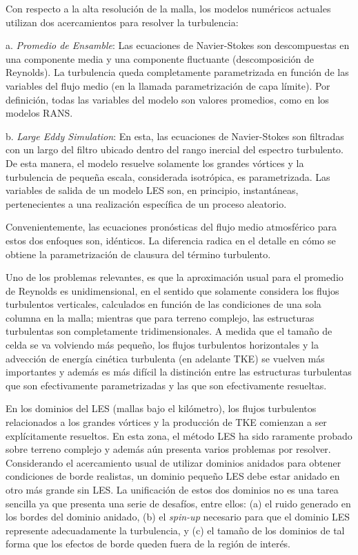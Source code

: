 Con respecto a la alta resolución de la malla, los modelos numéricos actuales utilizan dos acercamientos para resolver la turbulencia:
\begin{enumerate*}
	\item[a.] \emph{Promedio de Ensamble}: Las ecuaciones de Navier-Stokes son descompuestas en una componente media y una componente fluctuante (descomposición de Reynolds). La turbulencia queda completamente parametrizada en función de las variables del flujo medio (en la llamada parametrización de capa límite). Por definición, todas las variables del modelo son valores promedios, como en los modelos RANS.
	\item[b.] \emph{Large Eddy Simulation}: En esta, las ecuaciones de Navier-Stokes son filtradas con un largo del filtro ubicado dentro del rango inercial del espectro turbulento. De esta manera, el modelo resuelve solamente los grandes vórtices y la turbulencia de pequeña escala, considerada isotrópica, es parametrizada. Las variables de salida de un modelo LES son, en principio, instantáneas, pertenecientes a una realización específica de un proceso aleatorio.
\end{enumerate*} 

Convenientemente, las ecuaciones pronósticas del flujo medio atmosférico para estos dos enfoques son, idénticos. La diferencia radica en el detalle en cómo se obtiene la parametrización de clausura del término turbulento.

Uno de los problemas relevantes, es que la aproximación usual para el promedio de Reynolds es unidimensional, en el sentido que solamente considera los flujos turbulentos verticales, calculados en función de las condiciones de una sola columna en la malla; mientras que para terreno complejo, las estructuras turbulentas son completamente tridimensionales. A medida que el tamaño de celda se va volviendo más pequeño, los flujos turbulentos horizontales y la advección de energía cinética turbulenta (en adelante TKE) se vuelven más importantes y además es más difícil la distinción entre las estructuras turbulentas que son efectivamente parametrizadas y las que son efectivamente resueltas. 

En los dominios del LES (mallas bajo el kilómetro), los flujos turbulentos relacionados a los grandes vórtices y la producción de TKE comienzan a ser explícitamente resueltos. En esta zona, el método LES ha sido raramente probado sobre terreno complejo y además aún presenta varios problemas por resolver. Considerando el acercamiento usual de utilizar dominios anidados para obtener condiciones de borde realistas, un dominio pequeño LES debe estar anidado en otro más grande sin LES. La unificación de estos dos dominios no es una tarea sencilla ya que presenta una serie de desafíos, entre ellos: (a) el ruido generado en los bordes del dominio anidado, (b) el \emph{spin-up} necesario para que el dominio LES represente adecuadamente la turbulencia, y (c) el tamaño de los dominios de tal forma que los efectos de borde queden fuera de la región de interés.

